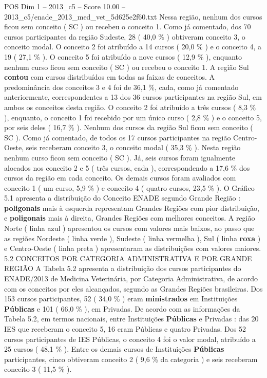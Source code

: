 \begin{textsample}{POS Dim 1 – 2013\_c5 – Score 10.00 – 2013\_c5/enade\_2013\_med\_vet\_5d625e2f60.txt}
Nessa região, nenhum dos cursos ficou sem conceito ( SC ) ou recebeu o conceito 1.
Como já comentado, dos 70 cursos participantes da região Sudeste, 28 ( 40,0 \% ) obtiveram conceito 3, o conceito modal.
O conceito 2 foi atribuído a 14 cursos ( 20,0 \% ) e o conceito 4, a 19 ( 27,1 \% ).
O conceito 5 foi atribuído a nove cursos ( 12,9 \% ), enquanto nenhum curso ficou sem conceito ( SC ) ou recebeu o conceito 1.
A região Sul \textbf{contou} com cursos distribuídos em todas as faixas de conceitos.
A predominância dos conceitos 3 e 4 foi de 36,1 \%, cada, como já comentado anteriormente, correspondentes a 13 dos 36 cursos participantes na região Sul, em ambos os conceitos desta região.
O conceito 2 foi atribuído a três cursos ( 8,3 \% ), enquanto, o conceito 1 foi recebido por um único curso ( 2,8 \% ) e o conceito 5, por seis deles ( 16,7 \% ).
Nenhum dos cursos da região Sul ficou sem conceito ( SC ).
Como já comentado, de todos os 17 cursos participantes na região Centro-Oeste, seis receberam conceito 3, o conceito modal ( 35,3 \% ).
Nesta região nenhum curso ficou sem conceito ( SC ).
Já, seis cursos foram igualmente alocados nos conceito 2 e 5 ( três cursos, cada ), correspondendo a 17,6 \% dos cursos da região em cada conceito.
Os demais cursos foram avaliados com conceito 1 ( um curso, 5,9 \% ) e conceito 4 ( quatro cursos, 23,5 \% ).
O Gráfico 5.1 apresenta a distribuição do Conceito ENADE segundo Grande Região : \textbf{poligonais} mais à esquerda representam Grandes Regiões com pior distribuição, e \textbf{poligonais} mais à direita, Grandes Regiões com melhores conceitos.
A região Norte ( linha azul ) apresentou os cursos com valores mais baixos, ao passo que as regiões Nordeste ( linha verde ), Sudeste ( linha vermelha ), Sul ( linha \textbf{roxa} ) e Centro-Oeste ( linha preta ) apresentaram as distribuições com valores maiores. 5.2 CONCEITOS POR CATEGORIA ADMINISTRATIVA E POR GRANDE REGIÃO A Tabela 5.2 apresenta a distribuição dos cursos participantes do ENADE/2013 de Medicina Veterinária, por Categoria Administrativa, de acordo com os conceitos por eles alcançados, segundo as Grandes Regiões brasileiras.
Dos 153 cursos participantes, 52 ( 34,0 \% ) eram \textbf{ministrados} em Instituições \textbf{Públicas} e 101 ( 66,0 \% ), em Privadas.
De acordo com as informações da Tabela 5.2, em termos nacionais, entre Instituições \textbf{Públicas} e Privadas : das 20 IES que receberam o conceito 5, 16 eram Públicas e quatro Privadas.
Dos 52 cursos participantes de IES Públicas, o conceito 4 foi o valor modal, atribuído a 25 cursos ( 48,1 \% ).
Entre os demais cursos de Instituições \textbf{Públicas} participantes, cinco obtiveram conceito 2 ( 9,6 \% da categoria ) e seis receberam conceito 3 ( 11,5 \% ).

\end{textsample}
